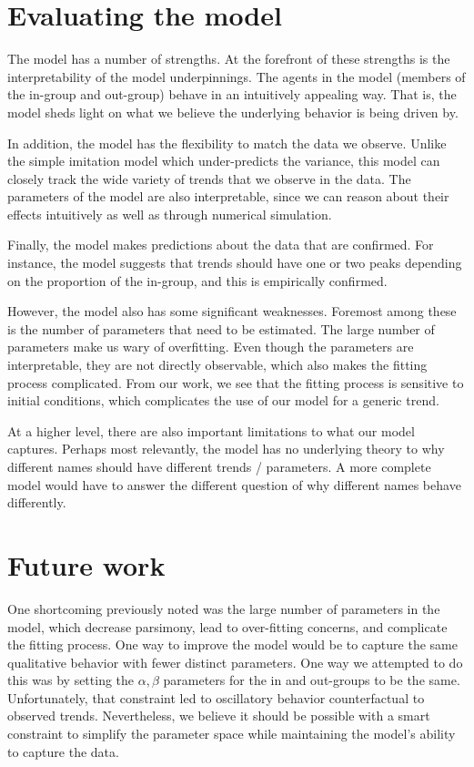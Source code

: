 \documentclass[a4paper]{article}
\begin{document}
\section{Evaluating the model}

The model has a number of strengths. At the forefront of these strengths is the
interpretability of the model underpinnings. The agents in the model (members of
the in-group and out-group) behave in an intuitively appealing way. That is, the
model sheds light on what we believe the underlying behavior is being driven by. 

In addition, the model has the flexibility to match the data we observe. Unlike
the simple imitation model which under-predicts the variance, this model can
closely track the wide variety of trends that we observe in the data. The
parameters of the model are also interpretable, since we can reason about their
effects intuitively as well as through numerical simulation.

Finally, the model makes predictions about the data that are confirmed. For
instance, the model suggests that trends should have one or two peaks depending
on the proportion of the in-group, and this is empirically confirmed.

However, the model also has some significant weaknesses. Foremost among these is
the number of parameters that need to be estimated. The large number of
parameters make us wary of overfitting. Even though the parameters are
interpretable, they are not directly observable, which also makes the fitting
process complicated. From our work, we see that the fitting process is sensitive
to initial conditions, which complicates the use of our model for a generic
trend. 

At a higher level, there are also important limitations to what our model
captures. Perhaps most relevantly, the model has no underlying theory to why
different names should have different trends / parameters. A more complete
model would have to answer the different question of why different names behave
differently. 

\section{Future work}

One shortcoming previously noted was the large number of parameters in the
model, which decrease parsimony, lead to over-fitting concerns, and complicate
the fitting process. One way to improve the model would be to capture the same
qualitative behavior with fewer distinct parameters. One way we attempted to do
this was by setting the $\alpha, \beta$ parameters for the in and out-groups to
be the same.  Unfortunately, that constraint led to oscillatory behavior
counterfactual to observed trends. Nevertheless, we believe it should be
possible with a smart constraint to simplify the parameter space while
maintaining the model's ability to capture the data.
\end{document}
